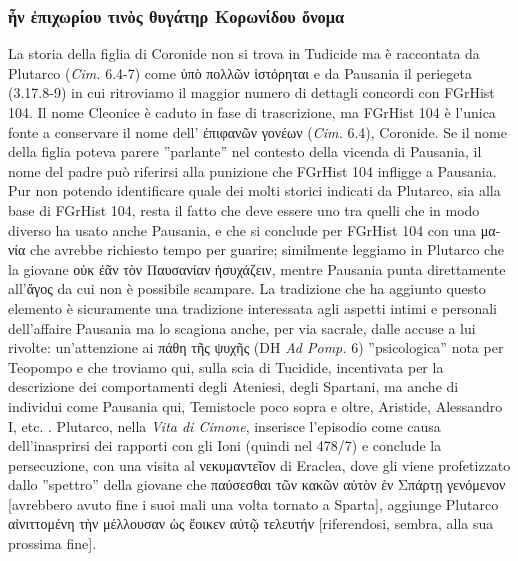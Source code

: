 {            \subsubsection{\textgreek{ἦν ἐπιχωρίου τινὸς θυγάτηρ Κορωνίδου ὄνομα}}\label{bkm:RefHeading3656419231068}
            La storia della figlia di Coronide non si trova in Tudicide ma è raccontata da  Plutarco (\emph{Cim.} 6.4-7) come \textgreek{ὑπὸ πολλῶν ἱστόρηται} e da Pausania il periegeta (3.17.8-9) in cui ritroviamo il maggior numero di dettagli concordi con FGrHist 104. Il nome Cleonice è caduto in fase di trascrizione, ma FGrHist 104 è l'unica fonte a conservare il nome dell' \textgreek{ἐπιφανῶν γονέων} (\emph{Cim.} 6.4), Coronide. Se il nome della figlia poteva parere ''parlante'' nel contesto della vicenda di Pausania, il nome del padre può riferirsi alla punizione che FGrHist 104 infligge a Pausania. Pur non potendo identificare quale dei molti storici indicati da Plutarco, sia alla base di FGrHist 104, resta il fatto che deve essere uno tra quelli che in modo diverso ha usato anche Pausania, e che si conclude per FGrHist 104 con una \textgreek{μανία} che avrebbe richiesto tempo per guarire; similmente leggiamo in Plutarco che la giovane  \textgreek{οὐκ ἐᾶν τὸν Παυσανίαν ἡσυχάζειν}, mentre Pausania punta direttamente all'\textgreek{ἄγος} da cui non è possibile scampare. La tradizione che ha aggiunto questo elemento è sicuramente una tradizione interessata agli aspetti intimi e personali dell'affaire Pausania  ma lo scagiona anche, per via sacrale, dalle accuse a lui rivolte: un'attenzione ai \textgreek{πάθη τῆς ψυχῆς} (DH \emph{Ad Pomp.} 6) ''psicologica'' nota per Teopompo  e che troviamo qui, sulla scia di Tucidide, incentivata per la descrizione dei comportamenti degli Ateniesi, degli Spartani, ma anche di individui come Pausania  qui, Temistocle poco sopra e oltre, Aristide, Alessandro I, etc. \cite[115]{Rebuffat1993}. Plutarco, nella \emph{Vita di Cimone}, inserisce l'episodio come causa dell'inasprirsi dei rapporti con gli Ioni (quindi nel 478/7) e conclude la persecuzione, con una visita al \textgreek{νεκυμαντεῖον} di Eraclea, dove gli viene profetizzato dallo ''spettro'' della giovane che \textgreek{παύσεσθαι τῶν κακῶν αὐτὸν ἐν Σπάρτῃ γενόμενον} [avrebbero avuto fine i suoi mali una volta tornato a Sparta], aggiunge Plutarco \textgreek{αἰνιττομένη τὴν μέλλουσαν ὡς ἔοικεν αὐτῷ τελευτήν} [riferendosi, sembra, alla sua prossima fine]. 
}
